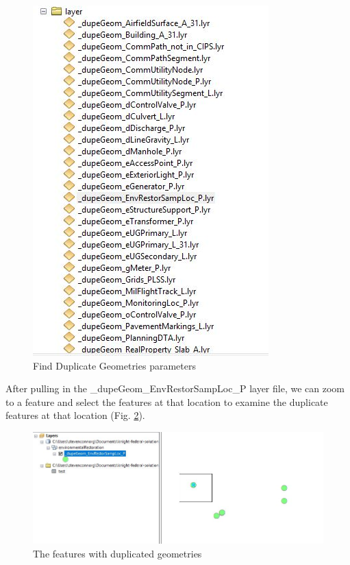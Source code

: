 \documentclass[openany]{book}
\theoremstyle{definition}
\theoremstyle{definition}
\theoremstyle{definition}
\theoremstyle{remark}
\begin{document}
\begin{figure}[H]

{\centering \includegraphics{figures/dupG-lays} 

}

\caption{Find Duplicate Geometries parameters}\label{fig:dupGlays}
\end{figure}

After pulling in the \_dupeGeom\_EnvRestorSampLoc\_P layer file, we can
zoom to a feature and select the features at that location to examine
the duplicate features at that location (Fig. \ref{fig:layFeats}).

\begin{figure}[H]

{\centering \includegraphics{figures/dupG-layFeats} 

}

\caption{The features with duplicated geometries}\label{fig:layFeats}
\end{figure}
\end{document}
